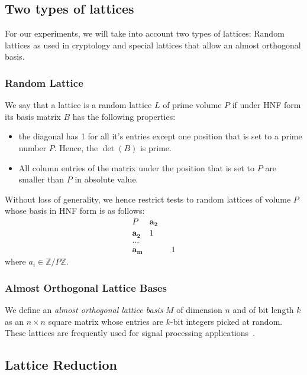 \documentclass[10pt, a4paper]{article}
\renewcommand{\vec}[1]{\mathbf{#1}}
\begin{document}
\subsection{Two types of lattices}
For our experiments, we will take into account two types of lattices: Random lattices as used in cryptology and special lattices that allow an almost orthogonal basis.

\subsubsection{Random Lattice}

We say that a lattice is a random lattice $L$ of prime volume $P$ if under HNF form its basis matrix $B$ has the following properties:

\begin{itemize}
\item the diagonal has 1 for all it's entries except one position that is set to a prime number $P$. Hence, the $\det(B)$ is prime.
\item All column entries of the matrix under the position that is set to $P$ are smaller than $P$ in absolute value.
\end{itemize}

Without loss of generality, we hence restrict tests to random lattices of volume $P$ whose basis in HNF form is as follows:
$$\begin{array}{ccccc}
P & \vec{a_2} &  & \\
\vec{a_2} & 1&   & \\ 
\dots & &  & \\ 
\vec{a_{m}} & & &1 
\end{array}$$
where $a_i \in \mathbb{Z}/ P\mathbb{Z}$.

\subsubsection{Almost Orthogonal Lattice Bases}

We define an \emph{almost orthogonal lattice basis} $M$ of dimension $n$ and of bit length $k$ as an $n \times n$ square matrix whose entries are $k$-bit integers picked at random. These lattices are frequently used for signal processing applications~\cite{originalJacobiMethodLatticeBasisReduction}.

\subsection{Lattice Reduction}
\end{document}
